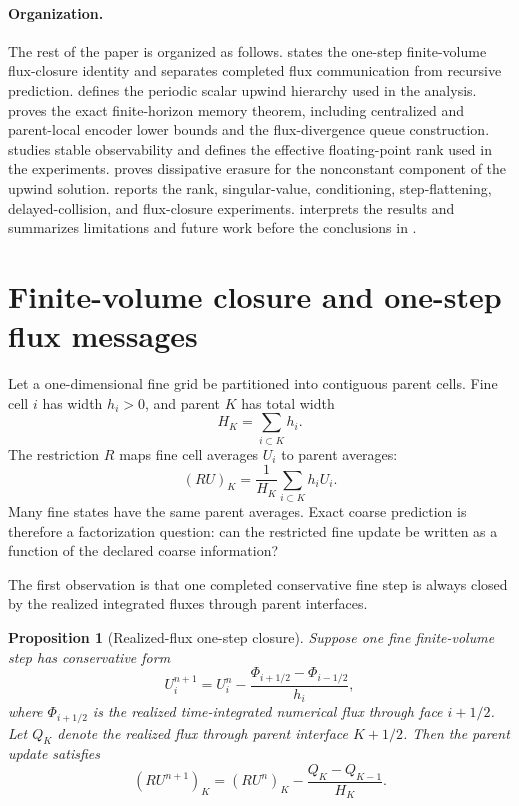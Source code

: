 \documentclass[pdflatex,sn-mathphys-num]{sn-jnl}%
\newtheorem{proposition}{Proposition}
\theoremstyle{thmstyleone}%
\theoremstyle{thmstyletwo}%
\theoremstyle{thmstylethree}%
\begin{document}
\paragraph{Organization.}
The rest of the paper is organized as follows.  
states the one-step finite-volume flux-closure identity and separates
completed flux communication from recursive prediction.  
defines the periodic scalar upwind hierarchy used in the analysis.
 proves the exact finite-horizon memory theorem, including
centralized and parent-local encoder lower bounds and the flux-divergence
queue construction.   studies stable
observability and defines the effective floating-point rank used in the
experiments.   proves dissipative erasure for the
nonconstant component of the upwind solution.   reports the
rank, singular-value, conditioning, step-flattening, delayed-collision, and
flux-closure experiments.   interprets the results and  summarizes limitations and future work before the
conclusions in .

\section{Finite-volume closure and one-step flux messages} \label{sec:fv_closure}

Let a one-dimensional fine grid be partitioned into contiguous parent cells.
Fine cell \(i\) has width \(h_i>0\), and parent \(K\) has total width
\[
  H_K=\sum_{i\subset K} h_i .
\]
The restriction \(R\) maps fine cell averages \(U_i\) to parent averages:
\[
  (RU)_K =
  \frac{1}{H_K}\sum_{i\subset K} h_i U_i .
\]
Many fine states have the same parent averages.  Exact coarse prediction is
therefore a factorization question: can the restricted fine update be written
as a function of the declared coarse information?

The first observation is that one completed conservative fine step is always
closed by the realized integrated fluxes through parent interfaces.

\begin{proposition}[Realized-flux one-step closure]
\label{prop:flux-closure}
Suppose one fine finite-volume step has conservative form
\[
  U_i^{n+1}
  =
  U_i^n
  -
  \frac{\Phi_{i+1/2}-\Phi_{i-1/2}}{h_i},
\]
where \(\Phi_{i+1/2}\) is the realized time-integrated numerical flux through
face \(i+1/2\).  Let \(Q_K\) denote the realized flux through parent interface
\(K+1/2\).  Then the parent update satisfies
\[
  (RU^{n+1})_K
  =
  (RU^n)_K
  -
  \frac{Q_K-Q_{K-1}}{H_K}.
\]
\end{proposition}
\end{document}

